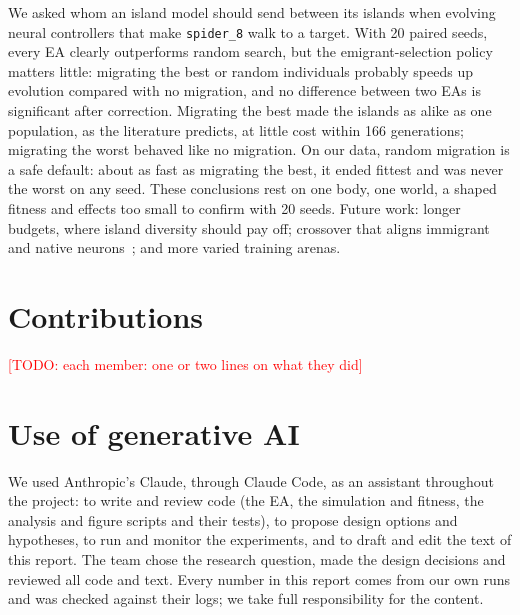 \documentclass[sigconf]{acmart}
\newcommand{\todo}[1]{\textcolor{red}{[TODO: #1]}}
\begin{document}
We asked whom an island model should send between its islands when
evolving neural controllers that make \texttt{spider\_8} walk to a target.
With 20 paired seeds, every EA clearly outperforms random search, but the
emigrant-selection policy matters little: migrating the best or random
individuals probably speeds up evolution compared with no migration, and no
difference between two EAs is significant after correction. Migrating the best
made the islands as alike as one population, as the literature predicts, at
little cost within 166 generations; migrating the worst behaved like no
migration. On our data, random migration is a safe default: about as fast as
migrating the best, it ended fittest and was never the worst on any seed. These
conclusions rest on one body, one world, a shaped fitness and effects too
small to confirm with 20 seeds. Future work: longer budgets, where island
diversity should pay off; crossover that aligns immigrant and native
neurons~\cite{uriot2020safe}; and more varied training arenas.




\section*{Contributions}
\todo{each member: one or two lines on what they did}

\section*{Use of generative AI}
We used Anthropic's Claude, through Claude Code, as an assistant throughout
the project: to write and review code (the EA, the simulation and fitness, the
analysis and figure scripts and their tests), to propose design options and
hypotheses, to run and monitor the experiments, and to draft and edit the text
of this report. The team chose the
research question, made the design decisions and reviewed all code and text.
Every number in this report comes from our own runs and was checked against
their logs; we take full responsibility for the content.
\end{document}
